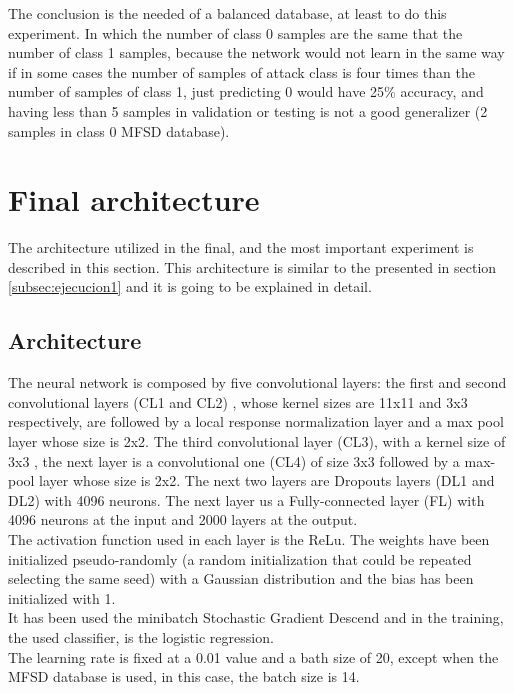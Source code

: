 The conclusion is the needed of a balanced database, at least to do this experiment. In which the number of class 0 samples are the same that the number of class 1 samples, because the network would not learn in the same way if in some cases the number of samples of  attack class is four times than the number of samples of class 1, just predicting 0 would have 25\% accuracy, and having less than 5 samples in validation or testing is not a good generalizer (2 samples in class 0 MFSD database).

\section{Final architecture}\label{Final_archi} %
The architecture utilized in the final, and the most important experiment is described in this section. This architecture is similar to the presented in section \ref{subsec:ejecucion1} and it is going to be explained in detail.

\subsection{Architecture}
The neural network is composed by five convolutional layers: the first and second convolutional layers (CL1 and CL2) , whose kernel sizes are 11x11 and 3x3 respectively, are followed by a local response normalization layer and a max pool layer whose size is 2x2. The third convolutional layer (CL3), with a kernel size of 3x3 , the next layer is a convolutional one (CL4) of size 3x3 followed by a max-pool layer whose size is 2x2. The next two layers are Dropouts layers (DL1 and DL2) with 4096 neurons. The next layer us a Fully-connected layer (FL) with 4096 neurons at the input and 2000 layers at the output.\\

The activation function used in each layer is the ReLu. The weights have been initialized pseudo-randomly (a random initialization that could be repeated selecting the same seed) with a Gaussian distribution and the bias has been initialized with 1.\\

It has been used the minibatch Stochastic Gradient Descend and in the training, the used classifier, is the logistic regression.\\

The learning rate is fixed at a 0.01 value and a bath size of 20, except when the MFSD database is used, in this case, the batch size is 14.

